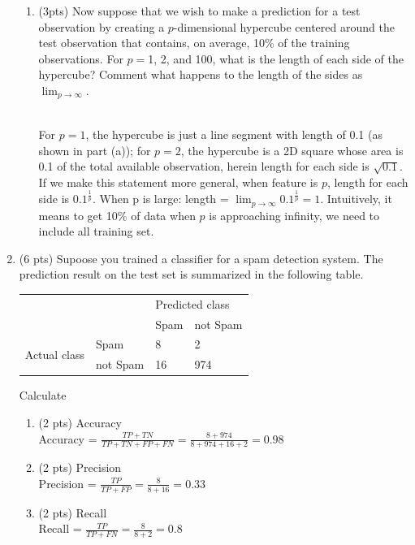 \documentclass[a4paper]{article}
\theoremstyle{definition}
\newenvironment{soln}{
    \leavevmode\color{blue}\ignorespaces
}{}
\begin{document}
\begin{enumerate}
\begin{enumerate}
	\item (3pts) Now suppose that we wish to make a prediction for a test observation by creating a $p$-dimensional hypercube centered around the test observation that contains, on average, 10\% of the training observations. For $p =$1, 2, and 100, what is the length of each side of the hypercube? Comment what happens to the length of the sides as $\lim_{{p \to \infty}}$.
	
	\begin{soln}\\
	For $p=1$, the hypercube is just a line segment with length of 0.1 (as shown in part (a)); for $p=2$, the hypercube is a 2D square whose area is 0.1 of the total available observation, herein length for each side is $\sqrt{0.1}$. If we make this statement more general, when feature is $p$, length for each side is $0.1^{\frac{1}{p}}$. When p is large: length = $\lim_{{p \to \infty}} 0.1^{\frac{1}{p}} = 1$. Intuitively, it means to get 10\% of data when $p$ is approaching infinity, we need to include all training set.\\
	\end{soln}
	
\end{enumerate}

\item (6 pts) Supoose you trained a classifier for a spam detection system. The prediction result on the test set is summarized in the following table.
\begin{center}
	\begin{tabular}{l l | l l}
		&          & \multicolumn{2}{l}{Predicted class} \\
		&          & Spam           & not Spam           \\
		\hline
		\multirow{2}{*}{Actual class} & Spam     & 8              & 2                  \\
		& not Spam & 16             & 974               
	\end{tabular}
\end{center}

Calculate
\begin{enumerate}
	\item (2 pts) Accuracy
	\begin{soln}\\
	Accuracy = $\frac{TP + TN}{TP + TN + FP + FN} = \frac{8 + 974}{8 + 974 + 16 + 2} = 0.98$
	\end{soln}
	\item (2 pts) Precision
	\begin{soln}\\
	Precision = $\frac{TP}{TP + FP} = \frac{8}{8 + 16} = 0.33$
	\end{soln}
	\item (2 pts) Recall
	\begin{soln}\\
	Recall = $\frac{TP}{TP + FN} = \frac{8}{8 + 2} = 0.8$
	\end{soln}
\end{enumerate}



\end{enumerate}
\end{document}
